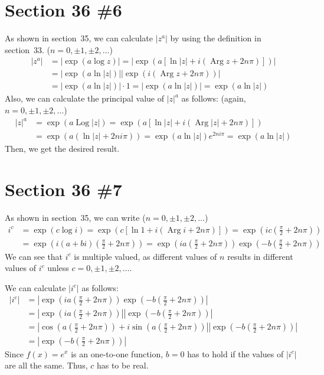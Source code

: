 \documentclass{scrartcl}
\begin{document}
\section{Section 36 \#6}
As shown in section~35, we can calculate \(|z^a|\) by using the definition in section~33. (\(n = 0, \pm 1, \pm 2, \dots\))
\begin{align*}
  |z^a| &= |\exp(a \log z)| = |\exp(a[\ln |z| + i(\operatorname{Arg} z + 2n\pi)])| \\
        &= |\exp(a \ln |z|)| |\exp(i(\operatorname{Arg} z + 2n\pi))| \\
        &= |\exp(a \ln |z|)| \cdot 1 = |\exp(a \ln |z|)| = \exp(a \ln |z|)
\end{align*}
Also, we can calculate the principal value of \(|z|^a\) as follows: (again, \(n = 0, \pm 1, \pm 2, \dots\))
\begin{align*}
  |z|^a &= \exp(a \operatorname{Log} |z|) = \exp(a[\ln |z| + i(\operatorname{Arg} |z| + 2n\pi)]) \\
        &= \exp(a(\ln |z| + 2ni\pi)) = \exp(a \ln |z|) e^{2ni\pi} = \exp(a \ln |z|)
\end{align*}
Then, we get the desired result.

\section{Section 36 \#7}
As shown in section~35, we can write (\(n = 0, \pm 1, \pm 2, \dots\))
\begin{align*}
  i^c &= \exp(c \log i) = \exp (c[\ln 1 + i(\operatorname{Arg} i + 2n\pi)]) = \exp \left( ic \left( \frac{\pi}{2} + 2n\pi \right) \right) \\
      &= \exp \left( i(a + bi) \left( \frac{\pi}{2} + 2n\pi \right) \right) = \exp \left( ia \left( \frac{\pi}{2} + 2n\pi \right) \right) \exp \left( -b \left( \frac{\pi}{2} + 2n\pi \right) \right)
\end{align*}
We can see that \(i^c\) is multiple valued, as different values of \(n\) results in different values of \(i^c\) unless \(c = 0, \pm 1, \pm 2, \dots\).

We can calculate \(|i^c|\) as follows:
\begin{align*}
  |i^c| &= \left| \exp \left( ia \left( \frac{\pi}{2} + 2n\pi \right) \right) \exp \left( -b \left( \frac{\pi}{2} + 2n\pi \right) \right) \right| \\
        &= \left| \exp \left( ia \left( \frac{\pi}{2} + 2n\pi \right) \right) \right| \left| \exp \left( -b \left( \frac{\pi}{2} + 2n\pi \right) \right) \right| \\
        &= \left| \cos \left( a \left( \frac{\pi}{2} + 2n\pi \right) \right) + i\sin \left( a \left( \frac{\pi}{2} + 2n\pi \right) \right) \right| \left| \exp \left( -b \left( \frac{\pi}{2} + 2n\pi \right) \right) \right| \\
        &= \left| \exp \left( -b \left( \frac{\pi}{2} + 2n\pi \right) \right) \right|
\end{align*}
Since \(f(x) = e^x\) is an one-to-one function, \(b = 0\) has to hold if the values of \(|i^c|\) are all the same.
Thus, \(c\) has to be real.
\end{document}
